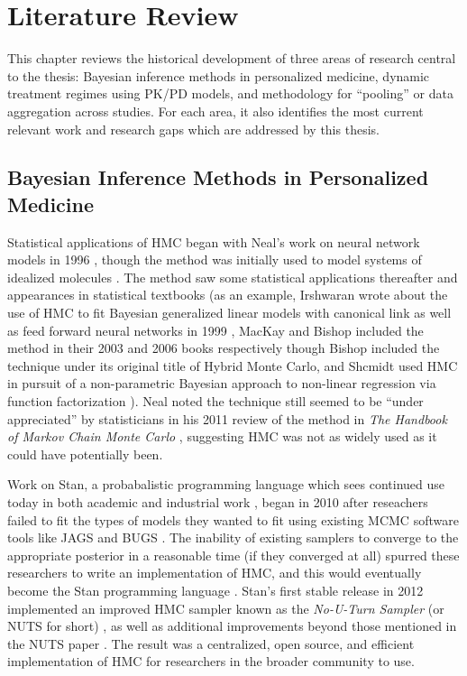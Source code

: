 \chapter{Literature Review}

This chapter reviews the historical development of three areas of research central to the thesis: Bayesian inference methods in personalized medicine, dynamic treatment regimes using PK/PD models, and methodology for “pooling” or data aggregation across studies. For each area, it also identifies the most current relevant work and research gaps which are addressed by this thesis.



\section{Bayesian Inference Methods in Personalized Medicine}

Statistical applications of HMC began with Neal's work on neural network models in 1996 \cite{Neal1996-vn, brooks2011handbook}, though the method was initially used to model systems of idealized molecules \cite{duane1987hybrid}. The method saw some statistical applications thereafter and appearances in statistical textbooks (as an example, Irshwaran wrote about the use of HMC to fit Bayesian generalized linear models with canonical link as well as feed forward neural networks in 1999 \cite{ishwaran1999applications}, MacKay \cite[Chapter~30]{mackay2003information} and Bishop \cite[Chapter~11]{Bishop2006pattern} included the method in their 2003 and 2006 books respectively though Bishop included the technique under its original title of Hybrid Monte Carlo, and Shcmidt used HMC in pursuit of a non-parametric Bayesian approach to non-linear regression via function factorization \cite{schmidt2009function}). Neal noted the technique still seemed to be ``under appreciated'' by statisticians in his 2011 review of the method in \textit{The Handbook of Markov Chain Monte Carlo} \cite[Chapter~5]{brooks2011handbook}, suggesting HMC was not as widely used as it could have potentially been.

Work on Stan, a probabalistic programming language which sees continued use today in both academic and industrial work \cite{betancourt2014geometric}, began in 2010 \cite{stan2012} after reseachers failed to fit the types of models they wanted to fit using existing MCMC software tools like JAGS \cite{plummer2003jags} and BUGS \cite{lunn2000winbugs}.  The inability of existing samplers to converge to the appropriate posterior in a reasonable time (if they converged at all) spurred these researchers to write an implementation of HMC, and this would eventually become the Stan programming language \cite{stan2012}.  Stan's first stable release in 2012 \cite{stan2012} implemented an improved HMC sampler known as the \textit{No-U-Turn Sampler} (or NUTS for short) \cite{stan2012, hoffman2014no}, as well as additional improvements beyond those mentioned in the NUTS paper \cite{stan2012}.  The result was a centralized, open source, and efficient implementation of HMC for researchers in the broader community to use.

